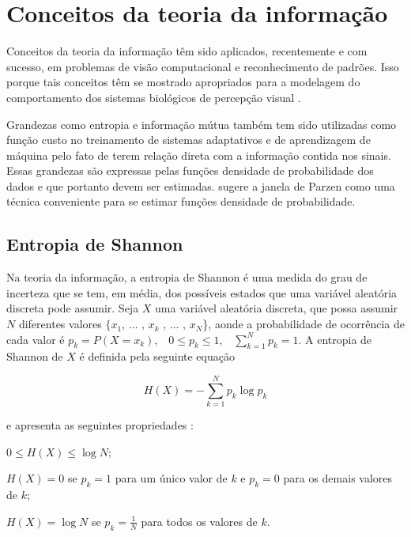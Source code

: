 \section{Conceitos da teoria da informação}

Conceitos da teoria da informação têm sido aplicados, recentemente e com sucesso, em problemas de visão computacional e reconhecimento de padrões. Isso porque tais conceitos têm se mostrado apropriados para a modelagem do comportamento dos sistemas biológicos de percepção visual \cite{Escolano:2009}.

Grandezas como entropia e informação mútua também tem sido utilizadas como função custo no treinamento de sistemas adaptativos e de aprendizagem de máquina \cite{Singh2011203} pelo fato de terem relação direta com a informação contida nos sinais. Essas grandezas são expressas pelas funções densidade de probabilidade dos dados e que portanto devem ser estimadas.  sugere a janela de Parzen \cite{Webb:2002} como uma técnica conveniente para se estimar funções densidade de probabilidade. 



\subsection{Entropia de Shannon}

Na teoria da informação, a entropia de Shannon é uma medida do grau de incerteza que se tem, em média, dos possíveis estados que uma variável aleatória discreta pode assumir. Seja  $X$ uma variável aleatória discreta, que possa assumir $N$ diferentes valores $\{x_1\text{, } \ldots\text{ , }x_k\text{ , }\ldots\text{ , }x_N$\}, aonde a probabilidade de ocorrência de cada valor é $p_k = P(X = x_k) \text{,} \quad 0 \leq p_k \leq 1 \text{,} \quad \sum \limits_{k=1}^N p_k = 1$. A entropia de Shannon de $X$ é definida pela seguinte equação 

\begin{equation}\label{eq:Shannon}
H(X) = -\sum\limits_{k = 1}^N p_k\log{p_k}
\end{equation}

e apresenta as seguintes propriedades \cite{Thomas:2006}:

\begin{alineas}
\item $0 \leq H(X) \leq \log{N}$;  
\item $H(X) = 0$ se $p_k = 1$ para um único valor de $k$ e $p_k = 0$ para os demais valores de $k$;
\item $H(X) = \log{N}$ se $p_k = \frac{1}{N}$ para todos os valores de $k$.
\end{alineas}

